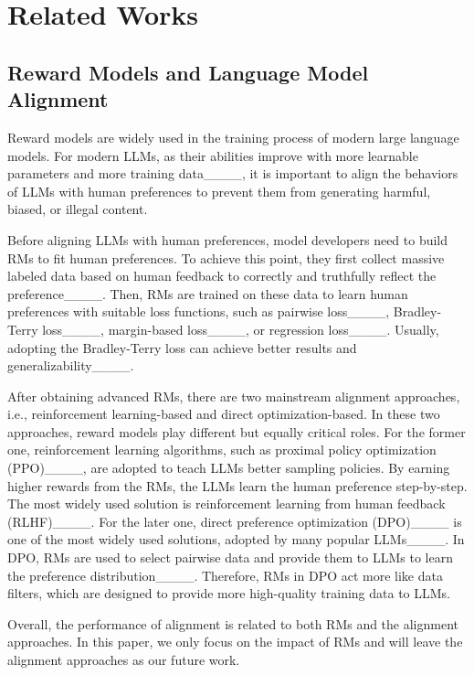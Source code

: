 \section{Related Works}
\label{sec:rw}

\subsection{Reward Models and Language Model Alignment}

Reward models are widely used in the training process of modern large language models. For modern LLMs, as their abilities improve with more learnable parameters and more training data____, it is important to align the behaviors of LLMs with human preferences to prevent them from generating harmful, biased, or illegal content. 

Before aligning LLMs with human preferences, model developers need to build RMs to fit human preferences. To achieve this point, they first collect massive labeled data based on human feedback to correctly and truthfully reflect the preference____. Then, RMs are trained on these data to learn human preferences with suitable loss functions, such as pairwise loss____, Bradley-Terry loss____, margin-based loss____, or regression loss____. Usually, adopting the Bradley-Terry loss can achieve better results and generalizability____.


After obtaining advanced RMs, there are two mainstream alignment approaches, i.e., reinforcement learning-based and direct optimization-based. In these two approaches, reward models play different but equally critical roles. For the former one, reinforcement learning algorithms, such as proximal policy optimization (PPO)____, are adopted to teach LLMs better sampling policies. By earning higher rewards from the RMs, the LLMs learn the human preference step-by-step. The most widely used solution is reinforcement learning from human feedback (RLHF)____.  For the later one, direct preference optimization (DPO)____ is one of the most widely used solutions, adopted by many popular LLMs____. In DPO, RMs are used to select pairwise data and provide them to LLMs to learn the preference distribution____. Therefore, RMs in DPO act more like data filters, which are designed to provide more high-quality training data to LLMs.


Overall, the performance of alignment is related to both RMs and the alignment approaches. In this paper, we only focus on the impact of RMs and will leave the alignment approaches as our future work.

